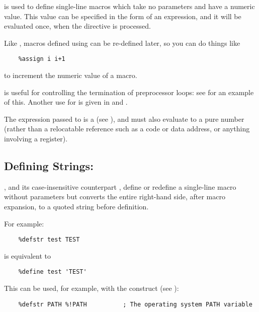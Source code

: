  is used to define single-line macros which take no
parameters and have a numeric value. This value can be specified in
the form of an expression, and it will be evaluated once, when the
 directive is processed.

Like , macros defined using  can be
re-defined later, so you can do things like

\begin{lstlisting}
	%assign i i+1
\end{lstlisting}

to increment the numeric value of a macro.

 is useful for controlling the termination of 
preprocessor loops: see  for an example of this. Another
use for  is given in  and
.

The expression passed to  is a 
(see ), and must also evaluate to a pure number
(rather than a relocatable reference such as a code or data address,
or anything involving a register).

\subsection{Defining Strings: }
\label{subsec:defstr}

, and its case-insensitive counterpart ,
define or redefine a single-line macro without parameters but converts
the entire right-hand side, after macro expansion, to a quoted string
before definition.

For example:

\begin{lstlisting}
	%defstr test TEST
\end{lstlisting}

is equivalent to

\begin{lstlisting}
	%define test 'TEST'
\end{lstlisting}

This can be used, for example, with the \code{\%!} construct
(see ):

\begin{lstlisting}
	%defstr PATH %!PATH          ; The operating system PATH variable
\end{lstlisting}

